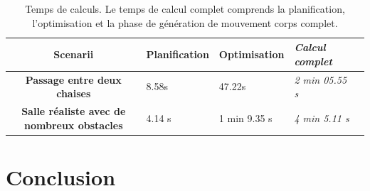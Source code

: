\begin{table}
  \begin{center}
    \begin{tabular}{|c|l l l|l|}
      \hline \bf Scenarii & Planification & Optimisation &
      \emph{Calcul complet}\\ \hline \bf Passage entre deux chaises &
      8.58s & 47.22s & \emph{2 min 05.55 s}\\ \hline \bf Salle
      réaliste avec de nombreux obstacles & 4.14 s & 1 min 9.35 s &
      \emph{4 min 5.11 s}\\ \hline
    \end{tabular}
  \end{center}
  \caption{Temps de calculs. Le temps de calcul complet comprends la
    planification, l'optimisation et la phase de génération de
    mouvement corps complet.\label{tbl:benchmarks}}
\end{table}


\section{Conclusion}

